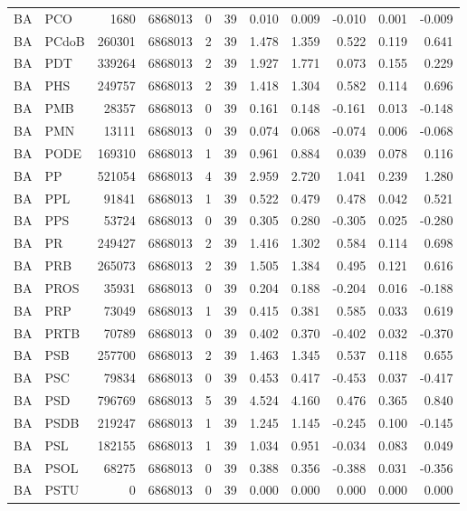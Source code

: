 \begin{landscape}
\begin{longtable}{llrrrrrrrrr}
BA & PCO & 1680 & 6868013 & 0 & 39 & 0.010 & 0.009 & -0.010 & 0.001 & -0.009 \\
BA & PCdoB & 260301 & 6868013 & 2 & 39 & 1.478 & 1.359 & 0.522 & 0.119 & 0.641 \\
BA & PDT & 339264 & 6868013 & 2 & 39 & 1.927 & 1.771 & 0.073 & 0.155 & 0.229 \\
BA & PHS & 249757 & 6868013 & 2 & 39 & 1.418 & 1.304 & 0.582 & 0.114 & 0.696 \\
BA & PMB & 28357 & 6868013 & 0 & 39 & 0.161 & 0.148 & -0.161 & 0.013 & -0.148 \\
BA & PMN & 13111 & 6868013 & 0 & 39 & 0.074 & 0.068 & -0.074 & 0.006 & -0.068 \\
BA & PODE & 169310 & 6868013 & 1 & 39 & 0.961 & 0.884 & 0.039 & 0.078 & 0.116 \\
BA & PP & 521054 & 6868013 & 4 & 39 & 2.959 & 2.720 & 1.041 & 0.239 & 1.280 \\
BA & PPL & 91841 & 6868013 & 1 & 39 & 0.522 & 0.479 & 0.478 & 0.042 & 0.521 \\
BA & PPS & 53724 & 6868013 & 0 & 39 & 0.305 & 0.280 & -0.305 & 0.025 & -0.280 \\
BA & PR & 249427 & 6868013 & 2 & 39 & 1.416 & 1.302 & 0.584 & 0.114 & 0.698 \\
BA & PRB & 265073 & 6868013 & 2 & 39 & 1.505 & 1.384 & 0.495 & 0.121 & 0.616 \\
BA & PROS & 35931 & 6868013 & 0 & 39 & 0.204 & 0.188 & -0.204 & 0.016 & -0.188 \\
BA & PRP & 73049 & 6868013 & 1 & 39 & 0.415 & 0.381 & 0.585 & 0.033 & 0.619 \\
BA & PRTB & 70789 & 6868013 & 0 & 39 & 0.402 & 0.370 & -0.402 & 0.032 & -0.370 \\
BA & PSB & 257700 & 6868013 & 2 & 39 & 1.463 & 1.345 & 0.537 & 0.118 & 0.655 \\
BA & PSC & 79834 & 6868013 & 0 & 39 & 0.453 & 0.417 & -0.453 & 0.037 & -0.417 \\
BA & PSD & 796769 & 6868013 & 5 & 39 & 4.524 & 4.160 & 0.476 & 0.365 & 0.840 \\
BA & PSDB & 219247 & 6868013 & 1 & 39 & 1.245 & 1.145 & -0.245 & 0.100 & -0.145 \\
BA & PSL & 182155 & 6868013 & 1 & 39 & 1.034 & 0.951 & -0.034 & 0.083 & 0.049 \\
BA & PSOL & 68275 & 6868013 & 0 & 39 & 0.388 & 0.356 & -0.388 & 0.031 & -0.356 \\
BA & PSTU & 0 & 6868013 & 0 & 39 & 0.000 & 0.000 & 0.000 & 0.000 & 0.000 \\

\end{longtable}
\end{landscape}
